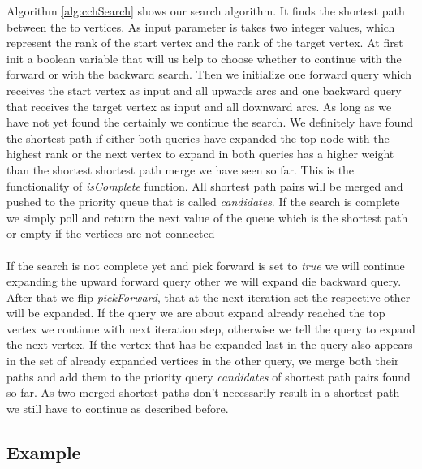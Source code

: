 Algorithm \ref{alg:cchSearch} shows our search algorithm. It finds the shortest path between the to vertices. As input parameter is takes two integer values, which represent the rank of the start vertex and the rank of the target vertex.
At first init a boolean variable that will us help to choose whether to continue with the forward or with the backward search. Then we initialize one forward query which receives the start vertex as input and all upwards arcs and one backward query that receives 
the target vertex as input and all downward arcs. As long as we have not yet found the certainly we continue the search. We definitely have found the shortest path if either both queries have expanded the top node with the highest rank or 
the next vertex to expand in both queries has a higher weight than the shortest shortest path merge we have seen so far. This is the functionality of \textit{isComplete} function. All shortest path pairs will be merged and pushed to the priority queue that is called \textit{candidates}.
If the search is complete we simply poll and return the next value of the queue which is the shortest path or empty if the vertices are not connected
\\\\
If the search is not complete yet and pick forward is set to \textit{true} we will continue expanding the upward forward query other we will expand die backward query. After that we flip \textit{pickForward}, that at the next iteration set the respective other will be expanded.
If the query we are about expand already reached the top vertex we continue with next iteration step, otherwise we tell the query to expand the next vertex. If the vertex that has be expanded last in the query also appears in the set of already 
expanded vertices in the other query, we merge both their paths and add them to the priority query \textit{candidates} of shortest path pairs found so far. As two merged shortest paths don't necessarily result in a shortest path we still have to continue as described before.




\subsection{Example}

